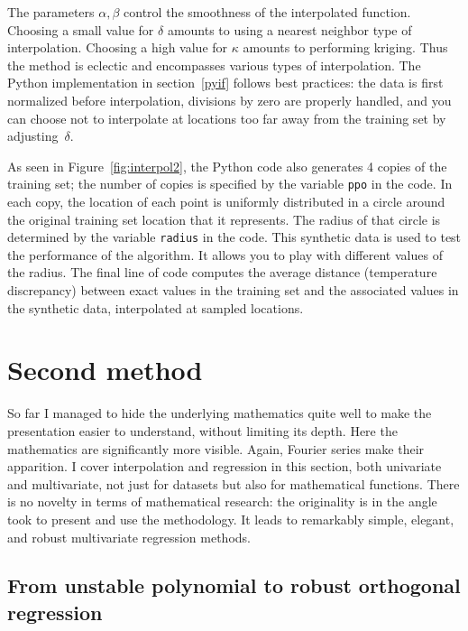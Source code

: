\documentclass[oneside,10pt]{book}
\begin{document}
The parameters $\alpha,\beta$ control the smoothness of the interpolated function. Choosing a small value for $\delta$ amounts to using a nearest neighbor type of interpolation. Choosing a high value for $\kappa$ amounts to performing kriging. Thus the method is eclectic and encompasses various types of interpolation. The Python implementation in section~\ref{pyif} follows best practices: the data is first normalized before interpolation, divisions by zero are properly handled, and you can choose not to interpolate at locations too far away from the training set by adjusting~$\delta$.

As seen in Figure~\ref{fig:interpol2}, the Python code also generates 4 copies of the training set; the number of copies is specified by the variable 
\texttt{ppo} in the code. In each copy, the location of each point is uniformly distributed in a circle around the original training set location that it represents. The radius of that circle is determined by the variable \texttt{radius} in the code. This 
\textcolor{index}{synthetic data} is used to test the performance of the algorithm. It allows you to play with different values of the radius. The final line of code computes the average distance (temperature discrepancy) between exact values in the training set and the associated values in the synthetic data, interpolated at sampled locations. 



\section{Second method}

So far I managed to hide the underlying mathematics quite well to make the presentation easier to understand, without limiting its depth. Here the mathematics are significantly  more visible. Again, Fourier series make their apparition. I cover interpolation and regression in this section, both univariate and multivariate, not just for datasets but also for mathematical functions. There is no novelty in terms of mathematical research: the originality is in the angle took to present and use the methodology. It leads to remarkably simple, elegant, and robust multivariate regression methods.

\subsection{From unstable polynomial to robust orthogonal  regression}
\end{document}
